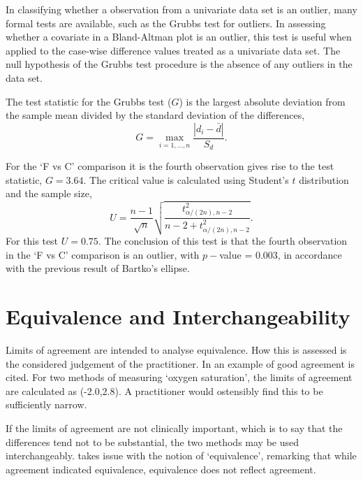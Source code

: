 \documentclass[12pt, a4paper]{report}
\theoremstyle{plain}
\theoremstyle{definition}
\theoremstyle{remark}
\begin{document}

In classifying whether a observation from a univariate data set is an outlier, many formal tests are available, such as the Grubbs test for outliers. In assessing whether a covariate in a Bland-Altman plot is an outlier, this test is useful when applied to the case-wise difference values treated as a univariate data set. The null hypothesis of the Grubbs test procedure is the absence of any outliers in the data set. 

The test statistic for the Grubbs test ($G$) is the largest absolute deviation from the sample mean divided by the standard
deviation of the differences,
\begin{equation}
G =  \displaystyle\max_{i=1,\ldots, n}\frac{\left \vert d_i -
	\bar{d}\right\vert}{S_{d}}.
\end{equation}

For the `F vs C' comparison it is the fourth observation gives rise to the test statistic, $G = 3.64$. The critical value is
calculated using Student's $t$ distribution and the sample size,
\[
U = \frac{n-1}{\sqrt{n}} \sqrt{\frac{t_{\alpha/(2n),n-2}^2}{n - 2
		+ t_{\alpha/(2n),n-2}^2}}.
\]
For this test $U = 0.75$. The conclusion of this test is that the fourth observation in the `F vs C' comparison is an outlier, with $p-$value = 0.003, in accordance with the previous result of Bartko's ellipse.








\section{Equivalence and Interchangeability}
Limits of agreement are intended to analyse equivalence. How this
is assessed is the considered judgement of the practitioner. In
\citet{BA86} an example of good agreement is cited. For two
methods of measuring `oxygen saturation', the limits of agreement
are calculated as (-2.0,2.8). A practitioner would ostensibly find
this to be sufficiently narrow.

If the limits of agreement are not clinically important, which is
to say that the differences tend not to be substantial, the two
methods may be used interchangeably. \citet{DunnSEME} takes issue
with the notion of `equivalence', remarking that while agreement
indicated equivalence, equivalence does not reflect agreement.
\end{document}

